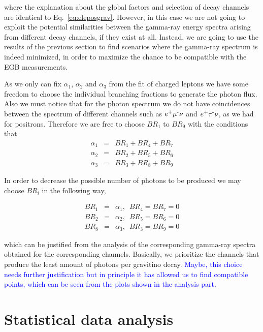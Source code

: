 \documentclass[a4paper,11pt]{article}
\newcommand*{\blue}{\textcolor{blue}}
\begin{document}
\noindent where the explanation about the global factors and selection of decay channels are identical to Eq.~\ref{eq:eleposgrav}. However, in this case we are not going to exploit the potential similarities between the gamma-ray energy spectra arising from different decay channels, if they exist at all. Instead, we are going to use the results of the previous section to find scenarios where the gamma-ray spectrum is indeed minimized, in order to maximize the chance to be compatible with the EGB measurements.

As we only can fix $\alpha_{1}$, $\alpha_{2}$ and $\alpha_{3}$ from the fit of charged leptons we have some freedom to choose the
individual branching fractions to generate the photon flux. Also we must notice that for the photon spectrum we do not have coincidences
between the spectrum of different channels such as $e\text{\textsuperscript{+}}\mu\text{\textsuperscript{-}}\nu$
and $e\text{\textsuperscript{+}}\tau\text{\textsuperscript{-}}\nu$,
as we had for positrons. Therefore we are free to choose $BR{}_{1}$
to $BR_{9}$ with the conditions that
\begin{eqnarray*}
\alpha_{1} & = & BR_{1}+BR_{4}+BR_{7}\\
\alpha_{2} & = & BR_{2}+BR_{5}+BR_{6}\\
\alpha_{3} & = & BR_{3}+BR_{8}+BR_{9}
\end{eqnarray*}


In order to decrease the possible number of photons to be produced we may choose $BR_{i}$ in the following way,

\begin{eqnarray*}
BR_{1} & = & \alpha_{1},\,\,\,BR_{4}=BR_{7}=0\\
BR_{2} & = & \alpha_{2},\,\,\,BR_{5}=BR_{6}=0\\
BR_{8} & = & \alpha_{3},\,\,\,BR_{3}=BR_{9}=0
\end{eqnarray*}

\noindent which can be justified from the analysis of the corresponding gamma-ray spectra obtained for the corresponding channels. Basically,
we prioritize the channels that produce the least amount of photons per gravitino decay. \blue{Maybe, this choice needs further justification but in principle it has allowed us to find compatible points, which can be seen from the plots shown in the analysis part.} 

\section{Statistical data analysis}
\end{document}
